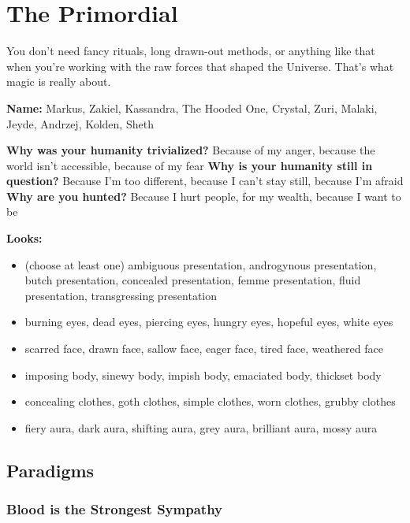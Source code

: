 \documentclass[
  oneside,
  statementpaper,
  9pt]{memoir}
\begin{document}
\newpage

\hypertarget{the-primordial}{%
\section{The Primordial}\label{the-primordial}}

You don't need fancy rituals, long drawn-out methods, or anything like
that when you're working with the raw forces that shaped the Universe.
That's what magic is really about.

\textbf{Name:} Markus, Zakiel, Kassandra, The Hooded One, Crystal, Zuri,
Malaki, Jeyde, Andrzej, Kolden, Sheth

\textbf{Why was your humanity trivialized?} Because of my anger, because
the world isn't accessible, because of my fear \textbf{Why is your
humanity still in question?} Because I'm too different, because I can't
stay still, because I'm afraid\\
\textbf{Why are you hunted?} Because I hurt people, for my wealth,
because I want to be

\textbf{Looks:}

\begin{itemize}
\tightlist
\item
  (choose at least one) ambiguous presentation, androgynous
  presentation, butch presentation, concealed presentation, femme
  presentation, fluid presentation, transgressing presentation
\item
  burning eyes, dead eyes, piercing eyes, hungry eyes, hopeful eyes,
  white eyes
\item
  scarred face, drawn face, sallow face, eager face, tired face,
  weathered face
\item
  imposing body, sinewy body, impish body, emaciated body, thickset body
\item
  concealing clothes, goth clothes, simple clothes, worn clothes, grubby
  clothes
\item
  fiery aura, dark aura, shifting aura, grey aura, brilliant aura, mossy
  aura
\end{itemize}

\hypertarget{paradigms-5}{%
\subsection{Paradigms}\label{paradigms-5}}

\hypertarget{blood-is-the-strongest-sympathy}{%
\subsubsection{Blood is the Strongest
Sympathy}\label{blood-is-the-strongest-sympathy}}
\end{document}
